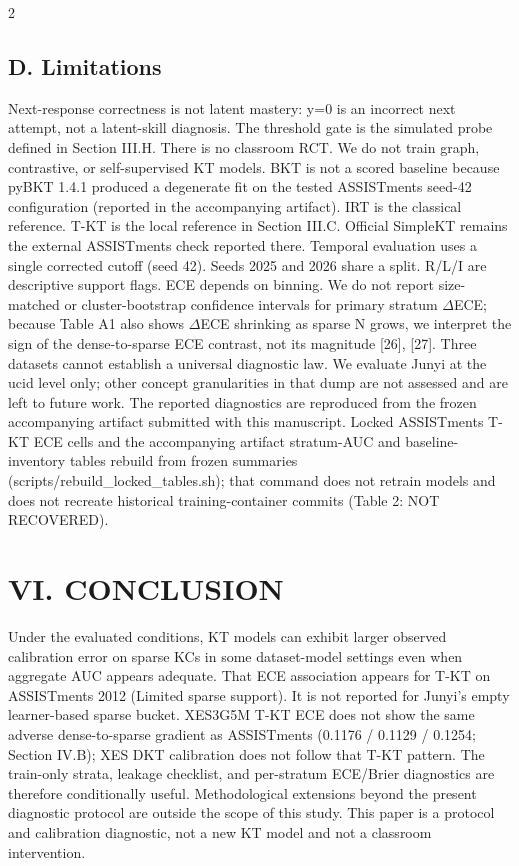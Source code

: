 \documentclass[10pt,a4paper]{article}
\begin{document}
\begin{multicols}{2}
\subsection*{D. Limitations}

 Next-response correctness is not latent mastery: y=0 is an incorrect next attempt, not a latent-skill diagnosis. The threshold gate is the simulated probe defined in Section III.H. There is no classroom RCT. We do not train graph, contrastive, or self-supervised KT models. BKT is not a scored baseline because pyBKT 1.4.1 produced a degenerate fit on the tested ASSISTments seed-42 configuration (reported in the accompanying artifact). IRT is the classical reference. T-KT is the local reference in Section III.C. Official SimpleKT remains the external ASSISTments check reported there. Temporal evaluation uses a single corrected cutoff (seed 42). Seeds 2025 and 2026 share a split. R/L/I are descriptive support flags. ECE depends on binning. We do not report size-matched or cluster-bootstrap confidence intervals for primary stratum $\Delta$ECE; because Table A1 also shows $\Delta$ECE shrinking as sparse N grows, we interpret the sign of the dense-to-sparse ECE contrast, not its magnitude [26], [27]. Three datasets cannot establish a universal diagnostic law. We evaluate Junyi at the ucid level only; other concept granularities in that dump are not assessed and are left to future work. The reported diagnostics are reproduced from the frozen accompanying artifact submitted with this manuscript. Locked ASSISTments T-KT ECE cells and the accompanying artifact stratum-AUC and baseline-inventory tables rebuild from frozen summaries (scripts/rebuild\_locked\_tables.sh); that command does not retrain models and does not recreate historical training-container commits (Table 2: NOT RECOVERED).

\section*{\MakeUppercase{VI. CONCLUSION}}

 Under the evaluated conditions, KT models can exhibit larger observed calibration error on sparse KCs in some dataset-model settings even when aggregate AUC appears adequate. That ECE association appears for T-KT on ASSISTments 2012 (Limited sparse support). It is not reported for Junyi's empty learner-based sparse bucket. XES3G5M T-KT ECE does not show the same adverse dense-to-sparse gradient as ASSISTments (0.1176 / 0.1129 / 0.1254; Section IV.B); XES DKT calibration does not follow that T-KT pattern. The train-only strata, leakage checklist, and per-stratum ECE/Brier diagnostics are therefore conditionally useful. Methodological extensions beyond the present diagnostic protocol are outside the scope of this study. This paper is a protocol and calibration diagnostic, not a new KT model and not a classroom intervention.


\end{multicols}
\end{document}
